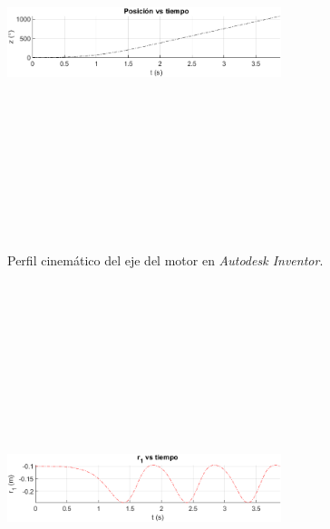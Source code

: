 \documentclass[12pt]{article}
\begin{document}
\begin{multicols}{2}
\begin{figure} [H]
    \end{figure}
        \vspace{-20pt}
        \begin{figure} [H]
        \centerline{\includegraphics[width=8cm, height=12cm,keepaspectratio]{simulacion/p2.png}}
        \caption{Perfil cinemático del eje del motor en \textit{Autodesk Inventor}.}
        \label{}
    \end{figure}
\begin{figure} [H]
        \centerline{\includegraphics[width=8cm, height=12cm,keepaspectratio]{simulacion/r1.png}}

\end{figure}
\end{multicols}
\end{document}
